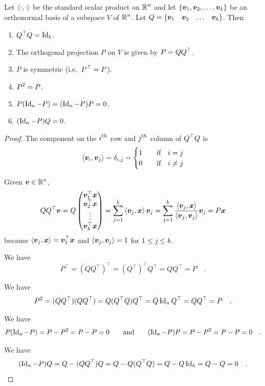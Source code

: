 \begin{prop}
Let $\left\langle{\cdot} , {\cdot}\right\rangle$ be the standard scalar product on
$\displaystyle \mathbb{R}^n$ and
let $\{\bm{v}_1, \bm{v}_2, \ldots , \bm{v}_k\}$ be an orthonormal
basis of a subspace $V$ of $\displaystyle \mathbb{R}^n$.  Let
$Q = \begin{pmatrix} \bm{v}_1 & \bm{v}_2 & \ldots & \bm{v}_k 
\end{pmatrix}$.  Then

\begin{enumerate}
\item $\displaystyle Q^\top Q = \operatorname{Id}_k$.  \label{C14L29}
\item The orthogonal projection $P$ on $V$ is given by
$\displaystyle P = QQ^\top$.
\item $P$ is symmetric (i.e.\ $\displaystyle P^\top = P$).
\item $\displaystyle P^2 = P$.
\item $P(\operatorname{Id}_n - P) = (\operatorname{Id}_n - P) P = 0$.
\item $(\operatorname{Id}_n - P )Q = 0$.
\end{enumerate}
\label{C14L30}
\end{prop}

\begin{proof}
  The component on the $\displaystyle i^{th}$ row and
$\displaystyle j^{th}$ column of $\displaystyle Q^\top Q$ is
\[
\left\langle{\bm{v}_i} , {\bm{v}_j}\right\rangle = \delta_{i,j}
= \begin{cases}
1 & \quad \text{if} \quad i = j \\
0 & \quad \text{if} \quad i \neq j
\end{cases}
\]

 Given $\displaystyle \bm{v} \in \mathbb{R}^n$,
\[
Q Q^\top \bm{v} = Q
\begin{pmatrix}
\bm{v}_1^\top \bm{x} \\
\bm{v}_2^\top \bm{x} \\
\vdots \\
\bm{v}_k^\top \bm{x}
\end{pmatrix}
= \sum_{j=1}^k \left\langle{\bm{v}_j} , {\bm{x}}\right\rangle \bm{v}_j
= \sum_{j=1}^k \frac{\left\langle{\bm{v}_j} , {\bm{x}}\right\rangle}{\left\langle{\bm{v}_j} , {\bm{v}_j}\right\rangle}
\bm{v}_j = P\bm{x}
\]
because $\displaystyle \left\langle{\bm{v}_j} , {\bm{x}}\right\rangle= \bm{v}_1^\top \bm{x}$
and $\left\langle{\bm{v}_j} , {\bm{v}_j}\right\rangle=1$ for $1\leq j \leq k$.

 We have
\[
  P^\top = (Q Q^\top)^\top = (Q^\top)^\top Q^\top = Q Q^\top = P \quad .
\]

 We have
\[
  P^2 = (Q Q^\top)(Q Q^\top) = Q (Q^\top Q) Q^\top
  = Q \operatorname{Id}_n Q^\top = Q Q^\top = P \quad .
\]

 We have
\[
 P(\operatorname{Id}_n-P) = P - P^2 = P - P = 0 \qquad \text{and} \qquad
 (\operatorname{Id}_n - P)P = P - P^2 = P - P = 0 \quad .
\]

 We have
\[
  (\operatorname{Id}_n - P)Q = Q - (Q Q^\top) Q = Q - Q ( Q^\top Q)
  = Q - Q \operatorname{Id}_k = Q - Q = 0 \quad .  \qedhere
\]
\end{proof}

